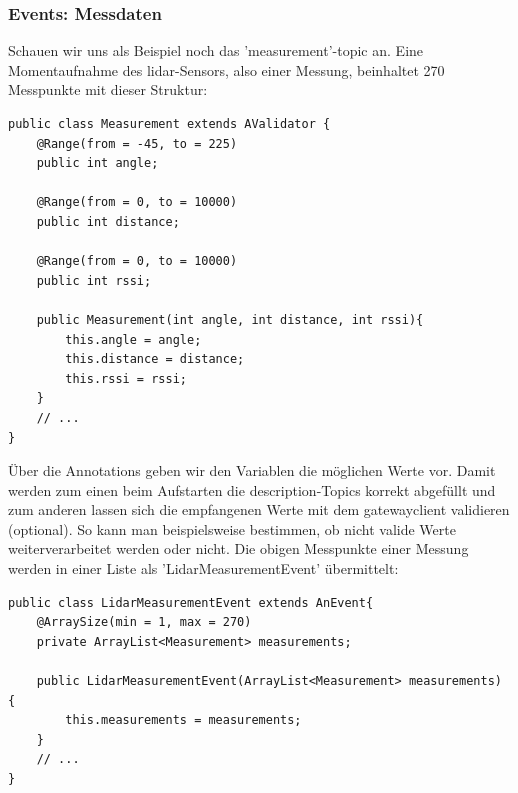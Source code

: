 \subsubsection{Events: Messdaten}
Schauen wir uns als Beispiel noch das 'measurement'-\Gls{topic} an. Eine Momentaufnahme des \acrshort{lidar}-Sensors, also einer Messung, beinhaltet 270 Messpunkte mit dieser Struktur:
\begin{lstlisting}[caption={TiM55x-Service - Struktur der Messpunkte},label={lst:tim55x-measurement}]
public class Measurement extends AValidator {
    @Range(from = -45, to = 225)
    public int angle;
    
    @Range(from = 0, to = 10000)
    public int distance;
    
    @Range(from = 0, to = 10000)
    public int rssi;

    public Measurement(int angle, int distance, int rssi){
        this.angle = angle;
        this.distance = distance;
        this.rssi = rssi;
    }
    // ...
}
\end{lstlisting}
Über die Annotations geben wir den Variablen die möglichen Werte vor. Damit werden zum einen beim Aufstarten die \Gls{description}-Topics korrekt abgefüllt und zum anderen lassen sich die empfangenen Werte mit dem \Gls{gatewayclient} validieren (optional). So kann man beispielsweise bestimmen, ob nicht valide Werte weiterverarbeitet werden oder nicht.
Die obigen Messpunkte einer Messung werden in einer Liste als 'LidarMeasurementEvent' übermittelt:
\begin{lstlisting}[caption={TiM55x-Service - Struktur des 'LidarMeasurementEvent'},label={lst:tim55x-measurementEvent}]
public class LidarMeasurementEvent extends AnEvent{
    @ArraySize(min = 1, max = 270)
    private ArrayList<Measurement> measurements;
    
    public LidarMeasurementEvent(ArrayList<Measurement> measurements) {
        this.measurements = measurements;
    }
    // ...
}
\end{lstlisting}

